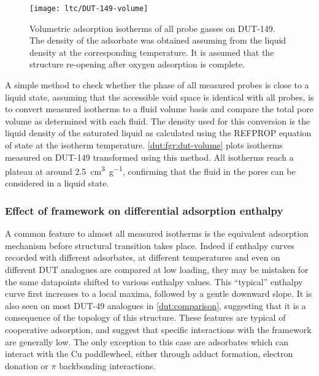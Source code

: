 \begin{figure}[htb]
    \centering
    \texttt{[image: ltc/DUT-149-volume]}%
    \caption{Volumetric adsorption isotherms of all probe gasses
    on DUT-149. The density of the adsorbate was obtained assuming
    from the liquid density at the corresponding temperature.
    It is assumed that the structure re-opening after oxygen
    adsorption is complete.}%
    \label{dut:fgr:dut-volume}
\end{figure}

A simple method to check whether the phase of all measured probes
is close to a liquid state, assuming that the accessible void space 
is identical with all probes, is to convert measured isotherms 
to a fluid volume basis and compare the total pore volume as determined
with each fluid. The density used for this conversion is the 
liquid density of the saturated liquid as calculated using the 
REFPROP equation of state at the isotherm temperature.
\autoref{dut:fgr:dut-volume} plots isotherms measured on DUT-149
transformed using this method. All isotherms reach a plateau at around 
\SI{2.5}{\centi\metre^3\per\gram}, confirming that the fluid in 
the pores can be considered in a liquid state.

\subsubsection{Effect of framework on differential adsorption enthalpy}

A common feature to almost all measured isotherms is the equivalent
adsorption mechanism before structural transition takes place.
Indeed if enthalpy curves recorded with different adsorbates, at different
temperatures and even on different DUT analogues are compared at low 
loading, they may be mistaken for the same datapoints shifted to
various enthalpy values.
This ``typical'' enthalpy curve first increases to a local maxima, followed
by a gentle downward slope. It is also seen on most DUT-49 analogues 
in \autoref{dut:comparison}, suggesting that it is a consequence of 
the topology of this structure.
These features are typical of cooperative adsorption, and suggest that
specific interactions with the framework are generally low. The only 
exception to this case are adsorbates which can interact with the 
Cu paddlewheel, either through adduct formation, 
electron donation or \(\pi\) backbonding interactions. 

